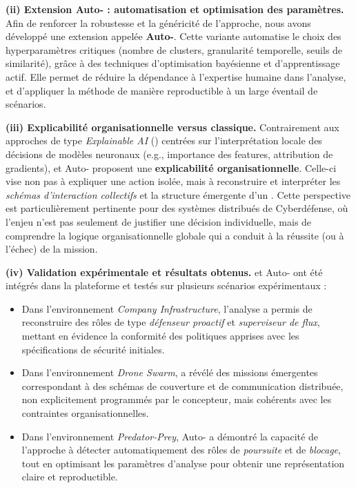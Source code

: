 \medskip
\noindent
\textbf{(ii) Extension Auto- : automatisation et optimisation des paramètres.}
Afin de renforcer la robustesse et la généricité de l'approche, nous avons développé une extension appelée \textbf{Auto-}.
Cette variante automatise le choix des hyperparamètres critiques (nombre de clusters, granularité temporelle, seuils de similarité), grâce à des techniques d'optimisation bayésienne et d'apprentissage actif.
Elle permet de réduire la dépendance à l'expertise humaine dans l'analyse, et d'appliquer la méthode de manière reproductible à un large éventail de scénarios.

\medskip
\noindent
\textbf{(iii) Explicabilité organisationnelle versus  classique.}
Contrairement aux approches de type \textit{Explainable AI} () centrées sur l'interprétation locale des décisions de modèles neuronaux (e.g., importance des features, attribution de gradients),  et Auto- proposent une \textbf{explicabilité organisationnelle}.
Celle-ci vise non pas à expliquer une action isolée, mais à reconstruire et interpréter les \textit{schémas d'interaction collectifs} et la structure émergente d'un .
Cette perspective est particulièrement pertinente pour des systèmes distribués de Cyberdéfense, où l'enjeu n'est pas seulement de justifier une décision individuelle, mais de comprendre la logique organisationnelle globale qui a conduit à la réussite (ou à l'échec) de la mission.

\medskip
\noindent
\textbf{(iv) Validation expérimentale et résultats obtenus.}
 et Auto- ont été intégrés dans la plateforme  et testés sur plusieurs scénarios expérimentaux :
\begin{itemize}
  \item Dans l'environnement \textit{Company Infrastructure}, l'analyse a permis de reconstruire des rôles de type \textit{défenseur proactif} et \textit{superviseur de flux}, mettant en évidence la conformité des politiques apprises avec les spécifications de sécurité initiales.
  \item Dans l'environnement \textit{Drone Swarm},  a révélé des missions émergentes correspondant à des schémas de couverture et de communication distribuée, non explicitement programmés par le concepteur, mais cohérents avec les contraintes organisationnelles.
  \item Dans l'environnement \textit{Predator-Prey}, Auto- a démontré la capacité de l'approche à détecter automatiquement des rôles de \textit{poursuite} et de \textit{blocage}, tout en optimisant les paramètres d'analyse pour obtenir une représentation claire et reproductible.
\end{itemize}

